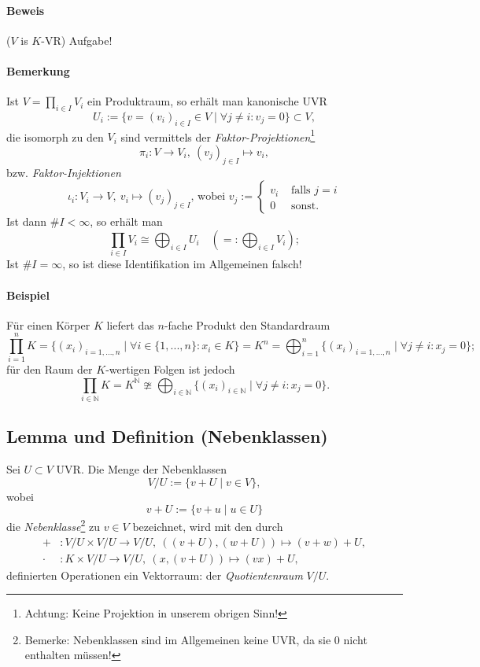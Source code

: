 \paragraph{Beweis} ($V$ is $K$-VR) Aufgabe!

\paragraph{Bemerkung} 
	Ist $V = \prod_{i\in I} V_i$ ein Produktraum, so erhält man kanonische UVR
		\[U_i:=\{v=(v_i)_{i\in I}\in V\mid\forall j \neq i:v_j = 0\}\subset V,\]
	die isomorph zu den $V_i$ sind vermittels der \emph{Faktor-Projektionen}\footnote{Achtung: Keine Projektion in unserem obrigen Sinn!}
		\[\pi_i:V\to V_i,\ (v_j)_{j\in I} \mapsto v_i,\]
	bzw. \emph{Faktor-Injektionen}
		\[\iota_i:V_i\to V,\ v_i \mapsto(v_j)_{j\in I}\text{, wobei }v_j :=
			\begin{cases}
				v_i &\text{ falls } j=i\\
				0 &\text{ sonst.}
			\end{cases}
		\]
	Ist dann $\# I < \infty$, so erhält man
		\[\prod_{i\in I} V_i\cong \bigoplus_{i\in I}U_i\quad (=: \bigoplus_{i\in I}V_i);\]
	Ist $\#I=\infty$, so ist diese Identifikation im Allgemeinen falsch!
	
\paragraph{Beispiel}
	Für einen Körper $ K $ liefert das $ n $-fache Produkt den Standardraum
		\[\prod_{i=1}^{n}K = \{(x_i)_{i = 1,...,n}\mid\forall i \in \{1,...,n\}: x_i \in K\} = K^n = \bigoplus_{i=1}^n\{(x_i)_{i = 1,...,n}\mid\forall j\neq i: x_j = 0\};\]
	für den Raum der $K$-wertigen Folgen ist jedoch
		\[\prod_{i\in \mathbb{N}}K=K^{\mathbb{N}}\ncong\bigoplus_{i\in \mathbb{N}}\{(x_i)_{i\in \mathbb{N}}\mid\forall j\neq i: x_j=0\}.\]
			
\subsection{Lemma und Definition (Nebenklassen)}
	\begin{Definition}[Nebenklassen]
		Sei $U\subset V$ UVR. Die Menge der Nebenklassen 
		\[V/U := \{v+U\mid v\in V\},\]
	wobei
		\[v+U:=\{v+u\mid u\in U\}\]
	die \emph{Nebenklasse}\footnote{Bemerke: Nebenklassen sind im Allgemeinen keine UVR, da sie $0$ nicht enthalten müssen!} zu $v\in V$ bezeichnet, wird mit den durch
		\begin{align*}
			+&: V/U \times V/U \to V/U,\ ((v+U),(w+U))\mapsto (v+w)+U,\\
			\cdot &: K\times V/U \to V/U,\ (x,(v+U))\mapsto (vx)+U,
		\end{align*}
	definierten Operationen ein Vektorraum: der \emph{Quotientenraum} $V/U$.
	\end{Definition}
			
